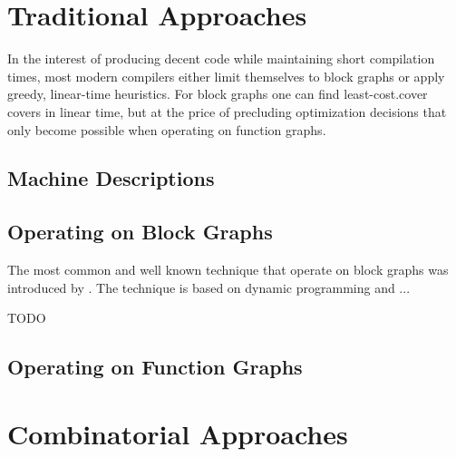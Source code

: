 \section{Traditional Approaches}

In the interest of producing decent code while maintaining short compilation
times, most modern \glspl{compiler} either limit themselves to \glspl{block
  graph} or apply greedy, linear-time heuristics.
%
For \glspl{block graph} one can find \gls{least-cost.cover} \glspl{cover} in
linear time, but at the price of precluding optimization decisions that only
become possible when operating on \glspl{function graph}.



\subsection{Machine Descriptions}




\subsection{Operating on Block Graphs}

The most common and well known technique that operate on \glspl{block graph} was
introduced by \textcite{AhoEtAl:1989}.
%
The technique is based on dynamic programming and ...


\begin{algorithm}[t]

  \caption{TODO}
\end{algorithm}



\subsection{Operating on Function Graphs}




\section{Combinatorial Approaches}

